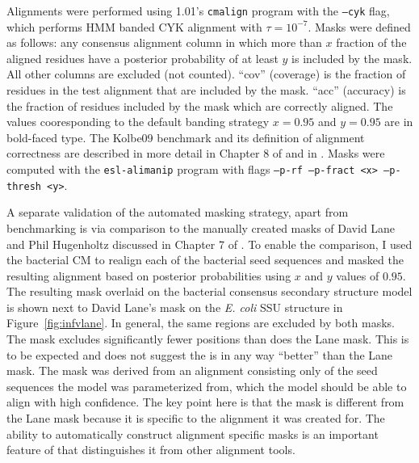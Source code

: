 \begin{table}
{  Alignments were performed using  1.01's {\tt cmalign}
  program with the {\tt --cyk} flag, which performs HMM banded CYK
  alignment with $\tau=10^{-7}$. Masks were defined as follows: any
  consensus alignment column in which more than $x$ fraction of the
  aligned residues have a posterior probability of at least $y$ is
  included by the mask. All other columns are excluded (not
  counted). ``cov'' (coverage) is the fraction of residues in the test
  alignment that are included by the mask. ``acc'' (accuracy) is the
  fraction of residues included by the mask which are correctly
  aligned. The values cooresponding to the  default
  banding strategy $x=0.95$ and $y=0.95$ are in bold-faced type.  The
  Kolbe09 benchmark and its definition of alignment correctness are
  described in more detail in Chapter 8 of \cite{Nawrocki09b} and in
  \cite{KolbeEddy09}. Masks were computed with the {\tt esl-alimanip}
  program with flags {\tt --p-rf --p-fract <x> --p-thresh <y>}.}
\label{tbl:kolbe09-pp}
\end{table}

A separate validation of the automated masking strategy, apart from
benchmarking is via comparison to the manually created masks of David
Lane and Phil Hugenholtz discussed in Chapter 7 of \cite{Nawrocki09b}. To
enable the comparison, I used the  bacterial CM to
realign each of the bacterial seed sequences and masked the resulting
alignment based on posterior probabilities using $x$ and $y$ values of
$0.95$. The resulting mask overlaid on the  bacterial
consensus secondary structure model is shown next to David Lane's mask
on the \emph{E. coli} SSU structure in Figure~\ref{fig:infvlane}. In
general, the same regions are excluded by both masks. The
 mask excludes significantly fewer positions than does
the Lane mask.  This is to be expected and does not suggest the
 is in any way ``better'' than the Lane mask.  The
 mask was derived from an alignment consisting only of
the seed sequences the model was parameterized from, which the model should
be able to align with high confidence. The key point here is that the
 mask is different from the Lane mask because it is specific to the
alignment it was created for. The ability to automatically construct 
alignment specific masks is an important feature of  that
distinguishes it from other alignment tools. 

